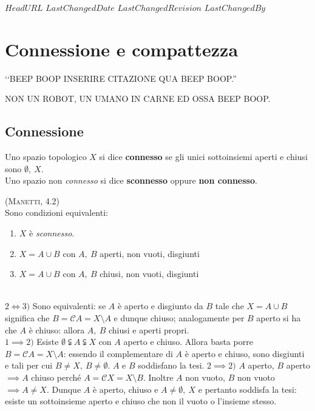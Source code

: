 \svnidlong
{$HeadURL$}
{$LastChangedDate$}
{$LastChangedRevision$}
{$LastChangedBy$}

\chapter{Connessione e compattezza}

\begin{introduction}
	‘‘BEEP BOOP INSERIRE CITAZIONE QUA BEEP BOOP.''
	\begin{flushright}
		\textsc{NON UN ROBOT,} UN UMANO IN CARNE ED OSSA BEEP BOOP.
	\end{flushright}
\end{introduction}

\section{Connessione}
\begin{define}
	Uno spazio topologico $X$ si dice \textbf{connesso} se gli unici sottoinsiemi aperti e chiusi sono $\emptyset,\ X$.\\
	Uno spazio non \textit{connesso} si dice \textbf{sconnesso} oppure \textbf{non connesso}.
\end{define}
\begin{lemming}\label{sconnesso}\textsc{(Manetti, 4.2)}\\
	Sono condizioni equivalenti:
	\begin{enumerate}
		\item $X$ è \textit{sconnesso}.
		\item $X=A\cup B$ con $A,\ B$ aperti, non vuoti, disgiunti
		\item $X=A\cup B$ con $A,\ B$ chiusi, non vuoti, disgiunti
	\end{enumerate}
\end{lemming}
\begin{demonstration}~{}\\
	$2\iff3)$ Sono equivalenti: se $A$ è aperto e disgiunto da $B$ tale che $X=A\cup B$ significa che $B=\mathcal{C}A=X\setminus A$ e dunque chiuso; analogamente per $B$ aperto si ha che $A$ è chiuso: allora $A,\ B$ chiusi e aperti propri.\\
	$1\implies2)$ Esiste $\emptyset\subsetneqq A \subsetneqq X$ con $A$ aperto e chiuso. Allora basta porre $B=\mathcal{C}A=X\setminus A$: essendo il complementare di $A$ è aperto e chiuso, sono disgiunti e tali per cui $B\neq X,\ B\neq \emptyset$. $A$ e $B$ soddisfano la tesi.
	$2\implies2)$ $A$ aperto, $B$ aperto $\implies A$ chiuso perché $A=\mathcal{C}X=X\setminus B$. Inoltre $A$ non vuoto, $B$ non vuoto $\implies A\neq X$. Dunque $A$ è aperto, chiuso e $A\neq \emptyset,\ X$ e pertanto soddisfa la tesi: esiste un sottoinsieme aperto e chiuso che non il vuoto o l'insieme stesso.
\end{demonstration}

